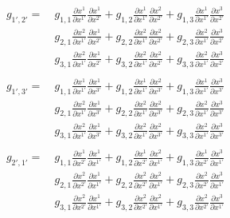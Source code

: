 \documentclass[a4paper]{article}
\begin{document}
  \[
    \begin{align*}
    g_{1', 2'} =
     &\ g_{1,1}\frac{\partial x^1}{\partial x^{1'}}\frac{\partial x^1}{\partial x^{2'}}
    +g_{1,2}\frac{\partial x^1}{\partial x^{1'}}\frac{\partial x^2}{\partial x^{2'}}
    +g_{1,3}\frac{\partial x^1}{\partial x^{1'}}\frac{\partial x^3}{\partial x^{2'}}\\
    &\
     g_{2,1}\frac{\partial x^2}{\partial x^{1'}}\frac{\partial x^1}{\partial x^{2'}}
    +g_{2,2}\frac{\partial x^2}{\partial x^{1'}}\frac{\partial x^2}{\partial x^{2'}}
    +g_{2,3}\frac{\partial x^2}{\partial x^{1'}}\frac{\partial x^3}{\partial x^{2'}}\\
    &\
     g_{3,1}\frac{\partial x^2}{\partial x^{1'}}\frac{\partial x^1}{\partial x^{2'}}
    +g_{3,2}\frac{\partial x^2}{\partial x^{1'}}\frac{\partial x^2}{\partial x^{2'}}
    +g_{3,3}\frac{\partial x^2}{\partial x^{1'}}\frac{\partial x^3}{\partial x^{2'}}\\
    \end{align*}
  \]
  \[
    \begin{align*}
    g_{1', 3'} =
     &\ g_{1,1}\frac{\partial x^1}{\partial x^{1'}}\frac{\partial x^1}{\partial x^{3'}}
    +g_{1,2}\frac{\partial x^1}{\partial x^{1'}}\frac{\partial x^2}{\partial x^{3'}}
    +g_{1,3}\frac{\partial x^1}{\partial x^{1'}}\frac{\partial x^3}{\partial x^{3'}}\\
    &\
     g_{2,1}\frac{\partial x^2}{\partial x^{1'}}\frac{\partial x^1}{\partial x^{3'}}
    +g_{2,2}\frac{\partial x^2}{\partial x^{1'}}\frac{\partial x^2}{\partial x^{3'}}
    +g_{2,3}\frac{\partial x^2}{\partial x^{1'}}\frac{\partial x^3}{\partial x^{3'}}\\
    &\
     g_{3,1}\frac{\partial x^2}{\partial x^{1'}}\frac{\partial x^1}{\partial x^{3'}}
    +g_{3,2}\frac{\partial x^2}{\partial x^{1'}}\frac{\partial x^2}{\partial x^{3'}}
    +g_{3,3}\frac{\partial x^2}{\partial x^{1'}}\frac{\partial x^3}{\partial x^{3'}}\\
    \end{align*}
  \]
    \begin{align*}
    g_{2', 1'} =\
     &g_{1,1}\frac{\partial x^1}{\partial x^{2'}}\frac{\partial x^1}{\partial x^{1'}}
    +g_{1,2}\frac{\partial x^1}{\partial x^{2'}}\frac{\partial x^2}{\partial x^{1'}}
    +g_{1,3}\frac{\partial x^1}{\partial x^{2'}}\frac{\partial x^3}{\partial x^{1'}}\\
    &
     g_{2,1}\frac{\partial x^2}{\partial x^{2'}}\frac{\partial x^1}{\partial x^{1'}}
    +g_{2,2}\frac{\partial x^2}{\partial x^{2'}}\frac{\partial x^2}{\partial x^{1'}}
    +g_{2,3}\frac{\partial x^2}{\partial x^{2'}}\frac{\partial x^3}{\partial x^{1'}}\\
    &
     g_{3,1}\frac{\partial x^2}{\partial x^{2'}}\frac{\partial x^1}{\partial x^{1'}}
    +g_{3,2}\frac{\partial x^2}{\partial x^{2'}}\frac{\partial x^2}{\partial x^{1'}}
    +g_{3,3}\frac{\partial x^2}{\partial x^{2'}}\frac{\partial x^3}{\partial x^{1'}}\\
    \end{align*}
\end{document}
